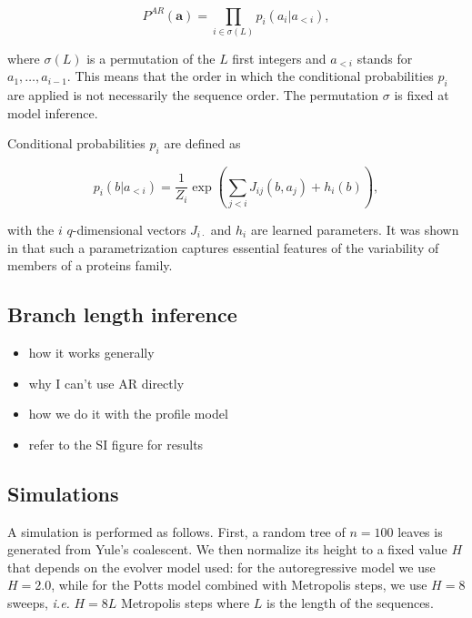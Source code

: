 \begin{equation}
	\label{eq:autoregressive_def_methods}
	P^{AR}(\mathbf{a}) = \prod_{i \in \sigma(L)} p_i(a_i \vert a_{<i}),
\end{equation}

where $\sigma(L)$ is a permutation of the $L$ first integers and $a_{<i}$ stands for $a_1, \ldots, a_{i-1}$. 
This means that the order in which the conditional probabilities $p_i$ are applied is not necessarily the sequence order. 
The permutation $\sigma$ is fixed at model inference. 

Conditional probabilities $p_i$ are defined as

\begin{equation}
	p_i(b \vert a_{<i}) = \frac{1}{Z_i}\exp\left( \sum_{j < i} J_{ij}(b, a_j) + h_i(b) \right),
\end{equation}

with the $i$ $q$-dimensional vectors $J_{i\cdot}$ and $h_i$ are learned parameters. 
It was shown in \cite{trinquier_efficientgenerativemodeling_2021} that such a parametrization captures essential features of the variability of members of a proteins family. 

\subsection{Branch length inference}

\begin{itemize}
	\item how it works generally
	\item why I can't use AR directly
	\item how we do it with the profile model
	\item refer to the SI figure for results
\end{itemize}

\subsection{Simulations}

A simulation is performed as follows. 
First, a random tree of $n=100$ leaves is generated from Yule's coalescent. 
We then normalize its height to a fixed value $H$ that depends on the evolver model used: for the autoregressive model we use $H=2.0$, while for the Potts model combined with Metropolis steps, we use $H=8$ sweeps, \emph{i.e.} $H=8 L$ Metropolis steps where $L$ is the length of the sequences. 

